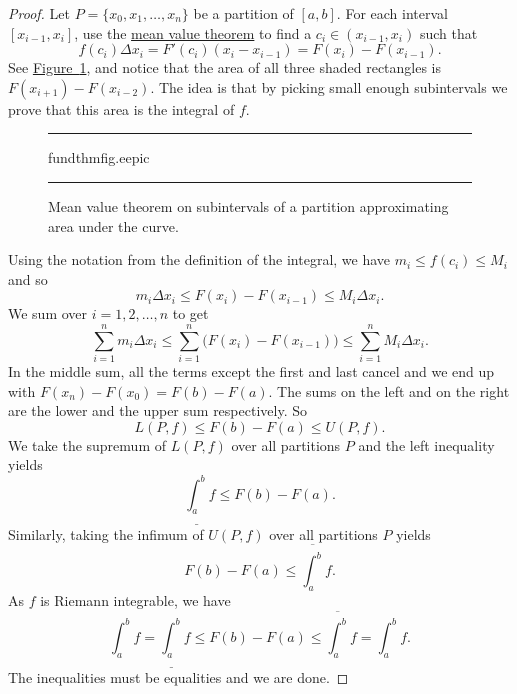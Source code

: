 \documentclass[12pt]{book}
\newenvironment{myfigureht}{%
\begin{figure}[h!t]
\noindent\rule{\textwidth}{0.4pt}\vspace{12pt}\par\centering}%
{\par\noindent\rule{\textwidth}{0.4pt}
\end{figure}}
\theoremstyle{plain}
\theoremstyle{remark}
\theoremstyle{definition}
\theoremstyle{exercise}
\theoremstyle{example}
\newcommand{\figureref}[1]{\hyperref[#1]{Figure~\ref*{#1}}}
\begin{document}
\begin{proof}
Let $P = \{ x_0, x_1, \ldots, x_n \}$ be a partition of $[a,b]$.
For each interval $[x_{i-1},x_i]$, use the
\hyperref[thm:mvt]{mean value theorem} to find a
$c_i \in (x_{i-1},x_i)$ such that
\begin{equation*}
f(c_i) \Delta x_i = F'(c_i) (x_i - x_{i-1}) = F(x_i) - F(x_{i-1}) .
\end{equation*}
See \figureref{fig:fundthmfig}, and
notice that the area of all
three shaded rectangles is $F(x_{i+1})-F(x_{i-2})$.
The idea is that by picking small enough subintervals
we prove that this area is the integral of $f$.
\begin{myfigureht}
{fundthmfig.eepic}
\caption{Mean value theorem on subintervals of a partition
approximating area under the curve.\label{fig:fundthmfig}}
\end{myfigureht}

Using the notation from the definition of the integral, we have
$m_i \leq f(c_i) \leq M_i$ and so
\begin{equation*}
m_i \Delta x_i \leq F(x_i) - F(x_{i-1}) \leq M_i \Delta x_i .
\end{equation*}
We sum over $i = 1,2, \ldots, n$ to get
\begin{equation*}
\sum_{i=1}^n m_i \Delta x_i
\leq \sum_{i=1}^n \bigl(F(x_i) - F(x_{i-1}) \bigr)
\leq \sum_{i=1}^n M_i \Delta x_i .
\end{equation*}
In the middle sum, all the terms except the first and last cancel 
and we end up with $F(x_n)-F(x_0) = F(b)-F(a)$.  The sums on the left
and on the right are the lower and the upper sum respectively.  So
\begin{equation*}
L(P,f) \leq F(b)-F(a) \leq U(P,f) .
\end{equation*}
We take the supremum of $L(P,f)$ over all partitions $P$ and the left inequality
yields 
\begin{equation*}
\underline{\int_a^b} f \leq F(b)-F(a) .
\end{equation*}
Similarly, taking
the infimum of $U(P,f)$ over all partitions $P$ yields
\begin{equation*}
F(b)-F(a) \leq \overline{\int_a^b} f .
\end{equation*}
As $f$ is Riemann integrable, we have
\begin{equation*}
\int_a^b f =
\underline{\int_a^b} f \leq F(b)-F(a) \leq \overline{\int_a^b} f
= \int_a^b f .
\end{equation*}
The inequalities must be equalities and we are done.
\end{proof}
\end{document}
